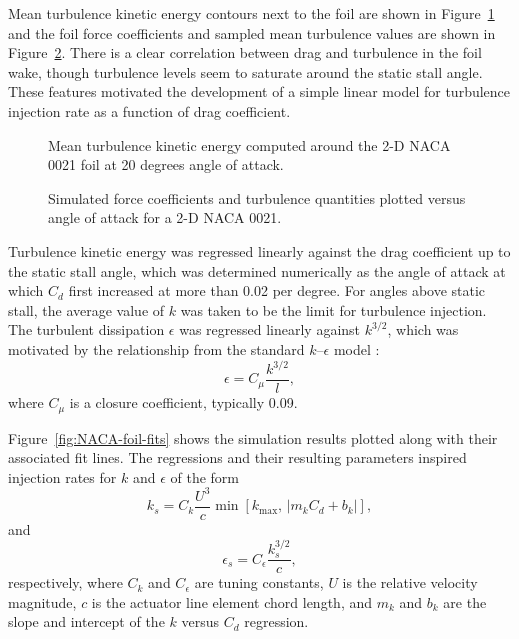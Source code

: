 Mean turbulence kinetic energy contours next to the foil are shown in
Figure~\ref{fig:NACA-foil-k} and the foil force coefficients and sampled mean
turbulence values are shown in Figure~\ref{fig:NACA-foil-coeffs}. There is a
clear correlation between drag and turbulence in the foil wake, though
turbulence levels seem to saturate around the static stall angle. These features
motivated the development of a simple linear model for turbulence injection rate
as a function of drag coefficient.

\begin{figure}
    \centering
    
    \caption{Mean turbulence kinetic energy computed around the 2-D NACA 0021
        foil at 20 degrees angle of attack.}
    
    \label{fig:NACA-foil-k}
\end{figure}

\begin{figure}
    \centering
    
    \caption{Simulated force coefficients and turbulence quantities plotted
        versus angle of attack for a 2-D NACA 0021.}
    
    \label{fig:NACA-foil-coeffs}
\end{figure}

Turbulence kinetic energy was regressed linearly against the drag coefficient up
to the static stall angle, which was determined numerically as the angle of
attack at which $C_d$ first increased at more than 0.02 per degree. For angles
above static stall, the average value of $k$ was taken to be the limit for
turbulence injection. The turbulent dissipation $\epsilon$ was regressed
linearly against $k^{3/2}$, which was motivated by the relationship from the
standard $k$--$\epsilon$ model \cite{Wilcox1994}:
\begin{equation}
    \epsilon = C_\mu \frac{k^{3/2}}{l},
\end{equation}
where $C_\mu$ is a closure coefficient, typically 0.09.

Figure~\ref{fig:NACA-foil-fits} shows the simulation results plotted along with
their associated fit lines. The regressions and their resulting parameters
inspired injection rates for $k$ and $\epsilon$ of the form
\begin{equation}
    k_s = C_k \frac{U^3}{c} \min \left[ k_{\max} ,\, | m_k C_d +
    b_k | \right],
\end{equation}
and
\begin{equation}
    \epsilon_s = C_\epsilon \frac{k_s^{3/2}}{c},
\end{equation}
respectively, where $C_k$ and $C_\epsilon$ are tuning constants, $U$ is the
relative velocity magnitude, $c$ is the actuator line element chord length, and
$m_k$ and $b_k$ are the slope and intercept of the $k$ versus $C_d$ regression.

